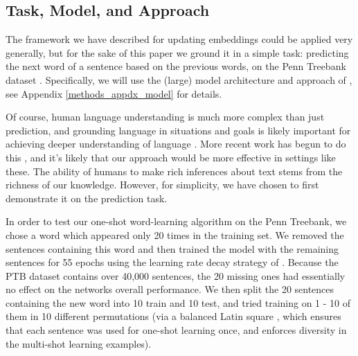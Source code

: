 \documentclass{article}
\begin{document}
\subsection{Task, Model, and Approach}
The framework we have described for updating embeddings could be applied very generally, but for the sake of this paper we ground it in a simple task: predicting the next word of a sentence based on the previous words, on the Penn Treebank dataset \citep{Marcus1993}. Specifically, we will use the (large) model architecture and approach of \citet{Zaremba2014a}, see Appendix \ref{methods_appdx_model} for details. \par
Of course, human language understanding is much more complex than just prediction, and grounding language in situations and goals is likely important for achieving deeper understanding of language \citep{Gauthier2016}. More recent work has begun to do this \citep[e.g]{Hermann2017}, and it's likely that our approach would be more effective in settings like these. The ability of humans to make rich inferences about text stems from the richness of our knowledge. However, for simplicity, we have chosen to first demonstrate it on the prediction task. \par 
In order to test our one-shot word-learning algorithm on the Penn Treebank, we chose a word which appeared only 20 times in the training set. We removed the sentences containing this word and then trained the model with the remaining sentences for 55 epochs using the learning rate decay strategy of \citet{Zaremba2014a}. Because the PTB dataset contains over 40,000 sentences, the 20 missing ones had essentially no effect on the networks overall performance. We then split the 20 sentences containing the new word into 10 train and 10 test, and tried training on 1 - 10 of them in 10 different permutations (via a balanced Latin square \citep{Campbell1980}, which ensures that each sentence was used for one-shot learning once, and enforces diversity in the multi-shot learning examples). 
\end{document}
